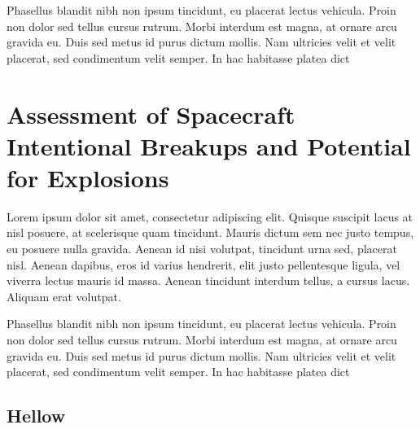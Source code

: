 \documentclass{article}
\begin{document}
Phasellus blandit nibh non ipsum tincidunt, eu placerat lectus vehicula. Proin non dolor sed tellus cursus rutrum. Morbi interdum est magna, at ornare arcu gravida eu. Duis sed metus id purus dictum mollis. Nam ultricies velit et velit placerat, sed condimentum velit semper. In hac habitasse platea dict

\section{Assessment of Spacecraft Intentional Breakups and Potential for Explosions}
Lorem ipsum dolor sit amet, consectetur adipiscing elit. Quisque suscipit lacus at nisl posuere, at scelerisque quam tincidunt. Mauris dictum sem nec justo tempus, eu posuere nulla gravida. Aenean id nisi volutpat, tincidunt urna sed, placerat nisl. Aenean dapibus, eros id varius hendrerit, elit justo pellentesque ligula, vel viverra lectus mauris id massa. Aenean tincidunt interdum tellus, a cursus lacus. Aliquam erat volutpat.

Phasellus blandit nibh non ipsum tincidunt, eu placerat lectus vehicula. Proin non dolor sed tellus cursus rutrum. Morbi interdum est magna, at ornare arcu gravida eu. Duis sed metus id purus dictum mollis. Nam ultricies velit et velit placerat, sed condimentum velit semper. In hac habitasse platea dict

\subsection{Hellow}
\end{document}
